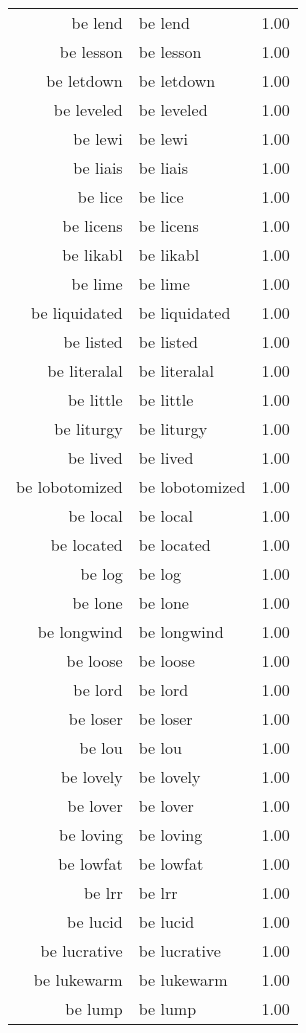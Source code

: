 \begin{table}[ht]
\begin{tabular}{rlr}
  be lend & be lend & 1.00 \\ 
  be lesson & be lesson & 1.00 \\ 
  be letdown & be letdown & 1.00 \\ 
  be leveled & be leveled & 1.00 \\ 
  be lewi & be lewi & 1.00 \\ 
  be liais & be liais & 1.00 \\ 
  be lice & be lice & 1.00 \\ 
  be licens & be licens & 1.00 \\ 
  be likabl & be likabl & 1.00 \\ 
  be lime & be lime & 1.00 \\ 
  be liquidated & be liquidated & 1.00 \\ 
  be listed & be listed & 1.00 \\ 
  be literalal & be literalal & 1.00 \\ 
  be little & be little & 1.00 \\ 
  be liturgy & be liturgy & 1.00 \\ 
  be lived & be lived & 1.00 \\ 
  be lobotomized & be lobotomized & 1.00 \\ 
  be local & be local & 1.00 \\ 
  be located & be located & 1.00 \\ 
  be log & be log & 1.00 \\ 
  be lone & be lone & 1.00 \\ 
  be longwind & be longwind & 1.00 \\ 
  be loose & be loose & 1.00 \\ 
  be lord & be lord & 1.00 \\ 
  be loser & be loser & 1.00 \\ 
  be lou & be lou & 1.00 \\ 
  be lovely & be lovely & 1.00 \\ 
  be lover & be lover & 1.00 \\ 
  be loving & be loving & 1.00 \\ 
  be lowfat & be lowfat & 1.00 \\ 
  be lrr & be lrr & 1.00 \\ 
  be lucid & be lucid & 1.00 \\ 
  be lucrative & be lucrative & 1.00 \\ 
  be lukewarm & be lukewarm & 1.00 \\ 
  be lump & be lump & 1.00 \\ 

\end{tabular}
\end{table}

